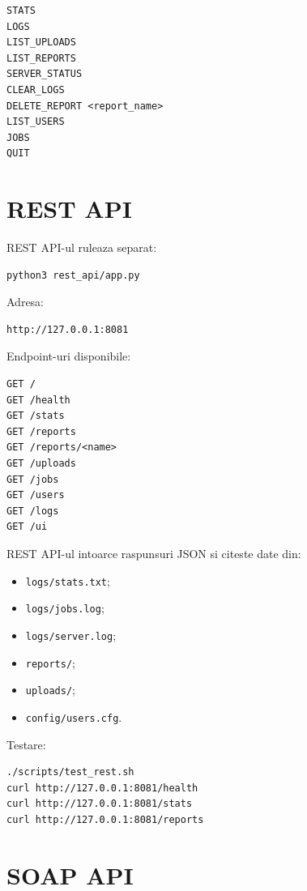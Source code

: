 \documentclass[12pt,a4paper]{article}
\begin{document}
\begin{lstlisting}[style=code]
STATS
LOGS
LIST_UPLOADS
LIST_REPORTS
SERVER_STATUS
CLEAR_LOGS
DELETE_REPORT <report_name>
LIST_USERS
JOBS
QUIT
\end{lstlisting}

\section{REST API}

REST API-ul ruleaza separat:

\begin{lstlisting}[style=code]
python3 rest_api/app.py
\end{lstlisting}

Adresa:

\begin{lstlisting}[style=code]
http://127.0.0.1:8081
\end{lstlisting}

Endpoint-uri disponibile:

\begin{lstlisting}[style=code]
GET /
GET /health
GET /stats
GET /reports
GET /reports/<name>
GET /uploads
GET /jobs
GET /users
GET /logs
GET /ui
\end{lstlisting}

REST API-ul intoarce raspunsuri JSON si citeste date din:

\begin{itemize}
    \item \texttt{logs/stats.txt};
    \item \texttt{logs/jobs.log};
    \item \texttt{logs/server.log};
    \item \texttt{reports/};
    \item \texttt{uploads/};
    \item \texttt{config/users.cfg}.
\end{itemize}

Testare:

\begin{lstlisting}[style=code]
./scripts/test_rest.sh
curl http://127.0.0.1:8081/health
curl http://127.0.0.1:8081/stats
curl http://127.0.0.1:8081/reports
\end{lstlisting}

\section{SOAP API}
\end{document}
